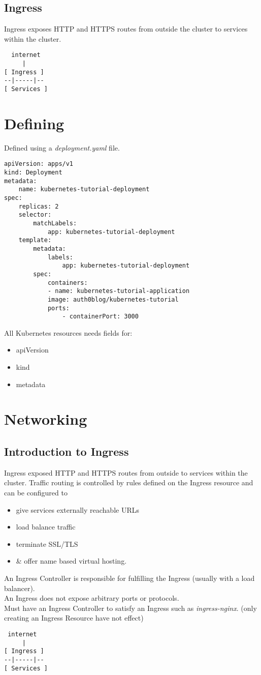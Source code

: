 \documentclass[]{article}
\newcommand{\<}{\guilsinglleft}
\renewcommand{\>}{\guilsinglright}
\renewcommand{\it}[1]{\textit{#1}}
\begin{document}
\subsection{Ingress}
Ingress exposes HTTP and HTTPS routes from outside the cluster to services within the cluster. 
\begin{lstlisting}
  internet
     |
[ Ingress ]
--|-----|--
[ Services ]
\end{lstlisting}


\section{Defining}
Defined using a \it{deployment.yaml} file.
\begin{lstlisting}
apiVersion: apps/v1
kind: Deployment
metadata:
	name: kubernetes-tutorial-deployment
spec:
	replicas: 2
	selector:
		matchLabels:
			app: kubernetes-tutorial-deployment
	template:
		metadata:
			labels:
				app: kubernetes-tutorial-deployment
		spec:
			containers:
			- name: kubernetes-tutorial-application
			image: auth0blog/kubernetes-tutorial
			ports:
				- containerPort: 3000

\end{lstlisting}

All Kubernetes resources needs fields for:
\begin{itemize}
	\item apiVersion
	\item kind
	\item metadata
\end{itemize}

\section{Networking}
\subsection{Introduction to Ingress}
Ingress exposed HTTP and HTTPS routes from outside to services within the cluster.  Traffic routing is controlled by rules defined on the Ingress resource and can be configured to
\begin{itemize}
	\item give services externally reachable URLs
	\item load balance traffic
	\item terminate SSL/TLS
	\item \& offer name based virtual hosting.
\end{itemize}
An Ingress Controller is responsible for fulfilling the Ingress (usually with a load balancer).\\
An Ingress does not expose arbitrary ports or protocols.\\
Must have an Ingress Controller to satisfy an Ingress such as \it{ingress-nginx}.  (only creating an Ingress Resource have not effect)
\begin{lstlisting}
 internet
     |
[ Ingress ]
--|-----|--
[ Services ]
\end{lstlisting}
\end{document}
